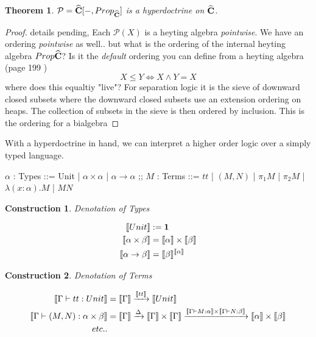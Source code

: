 \documentclass{article}
\newtheorem{thm}{Theorem}
\newtheorem*{construction}{Construction}
\begin{document}
\begin{thm}
    $\mathcal{P} = \widehat{\bf{C}}[- , Prop_{\widehat{\bf{C}}}]$ is a hyperdoctrine on $\widehat{\bf{C}}$.
\end{thm}
\begin{proof}
    details pending, Each $\mathcal{P}(X)$ is a heyting algebra \textit{pointwise}.
    We have an ordering \textit{pointwise} as well.. but what is the ordering of the 
    internal heyting algebra $Prop{\widehat{\bf{C}}}$? 
    Is it the \textit{default} ordering you can define from a heyting algebra (page 199 \cite{Sheaves})
    \[
      X \leq Y \iff X \land Y = X  
    \]
    where does this equaltiy "live"?
     For separation logic it is the sieve of downward closed subsets 
    where the downward closed subsets use an extension ordering on heaps. 
    The collection of subsets in the sieve is then ordered by inclusion. 
    This is the ordering for a bialgebra
\end{proof}

With a hyperdoctrine in hand, we can interpret a higher order logic over 
a simply typed language. 

\begin{bnf}
    $\alpha$ : Types ::= Unit | $\alpha \times \alpha$ | $\alpha \rightarrow \alpha$ ;;
    $M$ : Terms ::= $tt$ | $(M , N)$ | $\pi_1 M$ | $\pi_2 M$ | $\lambda (x \colon \alpha). M$ | $MN$
\end{bnf}

\begin{construction}
    Denotation of Types
\end{construction}
\begin{align*}
    \llbracket Unit \rrbracket &:= \bf{1} \\
    \llbracket \alpha \times \beta \rrbracket &= \llbracket \alpha \rrbracket \times \llbracket \beta \rrbracket\\
    \llbracket \alpha \rightarrow \beta \rrbracket &= \llbracket \beta \rrbracket^{\llbracket \alpha \rrbracket}
\end{align*}

\begin{construction}
    Denotation of Terms
\end{construction}
\begin{align*}
    \llbracket \Gamma \vdash tt : Unit \rrbracket &= \llbracket \Gamma \rrbracket \xrightarrow{\llbracket tt \rrbracket} \llbracket Unit \rrbracket\\ 
    \llbracket \Gamma \vdash (M , N) : \alpha \times \beta \rrbracket &= \llbracket \Gamma \rrbracket \xrightarrow{\Delta} \llbracket \Gamma \rrbracket \times \llbracket \Gamma \rrbracket \xrightarrow{\llbracket \Gamma \vdash M : \alpha \rrbracket\times \llbracket \Gamma \vdash N : \beta \rrbracket} \llbracket \alpha \rrbracket \times \llbracket \beta \rrbracket\\
    etc..
\end{align*}
\end{document}

